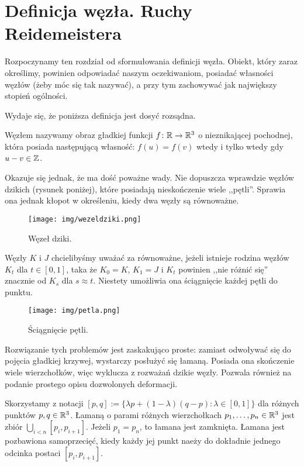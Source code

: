 \chapter{Definicja węzła. Ruchy Reidemeistera}
Rozpoczynamy ten rozdział od sformułowania definicji węzła.
Obiekt, który zaraz określimy, powinien odpowiadać naszym oczekiwaniom, posiadać własności węzłów (żeby móc się tak nazywać), a przy tym zachowywać jak największy stopień ogólności.

Wydaje się, że poniższa definicja jest dosyć rozsądna.

\begin{definicja}
\label{zladefinicja}
	Węzłem nazywamy obraz gładkiej funkcji $f \colon \mathbb R \to \mathbb R^3$ o nieznikającej pochodnej, która posiada następującą własność: $f(u) = f(v)$ wtedy i tylko wtedy gdy $u - v \in \mathbb Z$.
\end{definicja}

Okazuje się jednak, że ma dość poważne wady.
Nie dopuszcza wprawdzie węzłów dzikich (rysunek poniżej), które posiadają nieskończenie wiele ,,pętli''.
Sprawia ona jednak kłopot w określeniu, kiedy dwa węzły są równoważne.
\begin{figure}[!ht]
	\centering
	\texttt{[image: img/wezeldziki.png]}
	\caption{Węzeł dziki.}
	\label{fig:wezeldziki}
\end{figure}

Węzły $K$ i $J$ chcielibyśmy uważać za równoważne, jeżeli istnieje rodzina węzłów $K_t$ dla $t \in [0,1]$, taka że $K_0 = K$, $K_1 = J$ i $K_t$ powinien ,,nie różnić się'' znacznie od $K_s$ dla $s \approx t$.
Niestety umożliwia ona ściągnięcie każdej pętli do punktu.

\begin{figure}[!ht]
	\centering
	\texttt{[image: img/petla.png]}
	\caption{Ściągnięcie pętli.}
	\label{fig:wezeldziki}
\end{figure}

Rozwiązanie tych problemów jest zaskakująco proste: zamiast odwoływać się do pojęcia gładkiej krzywej, wystarczy posłużyć się łamaną.
Posiada ona skończenie wiele wierzchołków, więc wyklucza z rozważań dzikie węzły.
Pozwala również na podanie prostego opisu dozwolonych deformacji.

Skorzystamy z notacji $[p,q] := \{\lambda p + (1-\lambda)(q-p) : \lambda\in[0,1]\}$ dla różnych punktów $p, q \in \mathbb R^3$.
Łamaną o parami różnych wierzchołkach $p_1, \ldots, p_n \in \mathbb R^3$ jest zbiór $\bigcup_{i < n} [p_i, p_{i+1}]$.
Jeżeli $p_1 = p_n$, to łamana jest zamknięta.
Łamana jest pozbawiona samoprzecięć, kiedy każdy jej punkt naeży do dokładnie jednego odcinka postaci $[p_i, p_{i+1}]$.

